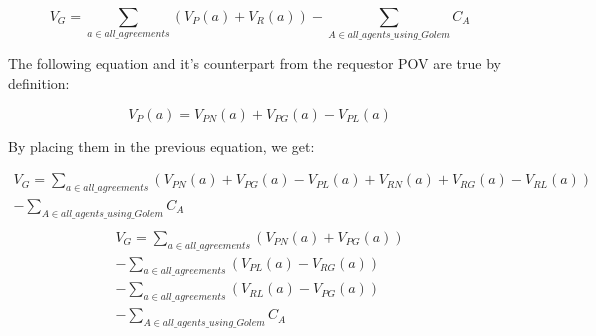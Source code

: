 \documentclass{article}
\begin{document}
\begin{equation}
    V_G = \sum_{a \in all\_agreements}(V_P(a) + V_R(a)) - \sum_{A \in all\_agents\_using\_Golem}C_A
\end{equation}

The following equation and it's counterpart from the requestor POV are true by definition:

\begin{equation}
    V_P(a) = V_{PN}(a) + V_{PG}(a) - V_{PL}(a)
\end{equation}

By placing them in the previous equation, we get:

\begin{equation}
\begin{split}
    V_G = \sum_{a \in all\_agreements}(V_{PN}(a) + V_{PG}(a) - V_{PL}(a) + V_{RN}(a) + V_{RG}(a) - V_{RL}(a)) \\
            - \sum_{A \in all\_agents\_using\_Golem}C_A \\
\end{split}
\end{equation}
\begin{equation}
\begin{split}
    V_G = \sum_{a \in all\_agreements}(V_{PN}(a) + V_{PG}(a)) \\
          - \sum_{a \in all\_agreements}(V_{PL}(a)- V_{RG}(a)) \\
          - \sum_{a \in all\_agreements}(V_{RL}(a)- V_{PG}(a)) \\
          - \sum_{A \in all\_agents\_using\_Golem}C_A
\end{split}
\end{equation}
\end{document}
